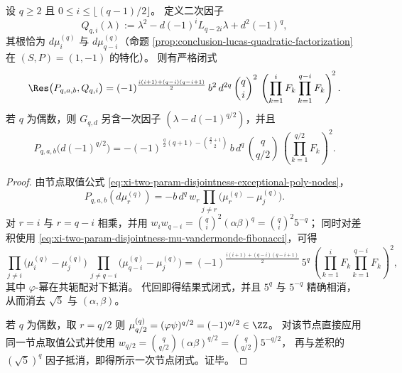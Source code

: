 \begin{proposition}\label{prop:conclusion-disjointness-pairwise-resultant-rigidity}
设 \(q\ge 2\) 且 \(0\le i\le \lfloor (q-1)/2\rfloor\)。
定义二次因子
\[
Q_{q,i}(\lambda):=\lambda^2-d(-1)^iL_{q-2i}\lambda+d^2(-1)^q,
\]
其根恰为 \(d\mu_i^{(q)}\) 与 \(d\mu_{q-i}^{(q)}\)（命题 \ref{prop:conclusion-lucas-quadratic-factorization} 在 \((S,P)=(1,-1)\) 的特化）。
则有严格闭式
\[
\Res\bigl(P_{q,a,b},Q_{q,i}\bigr)
=(-1)^{\frac{i(i+1)+(q-i)(q-i+1)}{2}}\,
b^{2}\,d^{2q}\,\binom{q}{i}^{2}\,
\left(\prod_{k=1}^{i}F_k\prod_{k=1}^{q-i}F_k\right)^{\!2}.
\]
若 \(q\) 为偶数，则 \(G_{q,d}\) 另含一次因子 \((\lambda-d(-1)^{q/2})\)，并且
\[
P_{q,a,b}\bigl(d(-1)^{q/2}\bigr)
=-(-1)^{\,\frac{q}{2}(q+1)-\binom{\frac{q}{2}+1}{2}}\,
b\,d^{q}\,\binom{q}{q/2}\,
\left(\prod_{k=1}^{q/2}F_k\right)^{\!2}.
\]
\end{proposition}
\begin{proof}
由节点取值公式 \eqref{eq:xi-two-param-disjointness-exceptional-poly-nodes}，
\[
P_{q,a,b}(d\mu_r^{(q)})
=-b\,d^{q}\,w_r\prod_{j\ne r}\bigl(\mu_r^{(q)}-\mu_j^{(q)}\bigr).
\]
对 \(r=i\) 与 \(r=q-i\) 相乘，并用
\(
w_iw_{q-i}=\binom{q}{i}^2(\alpha\beta)^q=\binom{q}{i}^2 5^{-q}
\)；
同时对差积使用 \eqref{eq:xi-two-param-disjointness-mu-vandermonde-fibonacci}，可得
\[
\prod_{j\ne i}\bigl(\mu_i^{(q)}-\mu_j^{(q)}\bigr)\,
\prod_{j\ne q-i}\bigl(\mu_{q-i}^{(q)}-\mu_j^{(q)}\bigr)
=(-1)^{\frac{i(i+1)+(q-i)(q-i+1)}{2}}\,
5^{q}\,
\left(\prod_{k=1}^{i}F_k\prod_{k=1}^{q-i}F_k\right)^{\!2},
\]
其中 \(\varphi\)-幂在共轭配对下抵消。
代回即得结果式闭式，并且 \(5^{q}\) 与 \(5^{-q}\) 精确相消，从而消去 \(\sqrt5\) 与 \((\alpha,\beta)\)。
\par
若 \(q\) 为偶数，取 \(r=q/2\) 则 \(\mu_{q/2}^{(q)}=(\varphi\psi)^{q/2}=(-1)^{q/2}\in\ZZ\)。
对该节点直接应用同一节点取值公式并使用 \(w_{q/2}=\binom{q}{q/2}(\alpha\beta)^{q/2}=\binom{q}{q/2}5^{-q/2}\)，
再与差积的 \((\sqrt5)^{q}\) 因子抵消，即得所示一次节点闭式。证毕。
\end{proof}


